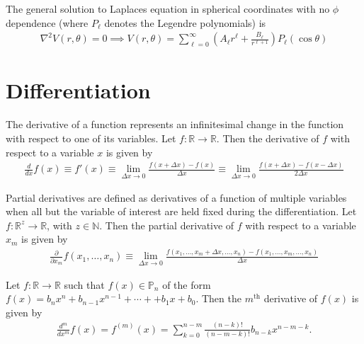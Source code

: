 \begin{theo}{1}
	The general solution to Laplaces equation in spherical coordinates with no $\phi$ dependence (where $P_\ell$ denotes the Legendre polynomials) is
	\begin{align}
		\nabla^2 V(r,\theta) = 0 \implies V(r,\theta) = \sum_{\ell=0}^{\infty}\left(A_\ell r^\ell+\frac{B_\ell}{r^{\ell+1}}\right)P_\ell(\cos\theta)
	\end{align}
\end{theo}



\section{Differentiation}
\begin{defn}{1}
	The derivative of a function represents an infinitesimal change in the function with respect to one of its variables. Let $f:\mathbb{R}\rightarrow\mathbb{R}$. Then the derivative of $f$ with respect to a variable $x$ is given by
	\begin{align}
	\frac{d}{dx}f(x)\equiv f'(x) \equiv\lim\limits_{\Delta x \rightarrow 0}\frac{f(x+\Delta x)-f(x)}{\Delta x} \equiv \lim\limits_{\Delta x \rightarrow 0}\frac{f(x+\Delta x)-f(x-\Delta x)}{2\Delta x}
	\end{align}
\end{defn} 
\begin{defn}{1}
	Partial derivatives are defined as derivatives of a function of multiple variables when all but the variable of interest are held fixed during the differentiation. Let $f:\mathbb{R}^z\rightarrow\mathbb{R}$, with $z \in \mathbb{N}$. Then the partial derivative of $f$ with respect to a variable $x_m$ is given by
	\begin{align}
	\frac{\partial}{\partial x_m}f(x_1,\dots,x_n) \equiv \lim\limits_{\Delta x \rightarrow 0}\frac{f(x_1,\dots,x_m+\Delta x, \dots,x_n)-f(x_1,\dots,x_m,\dots,x_n)}{\Delta x}
	\end{align}
\end{defn}
\begin{fancybox}{}
	Let $f:\mathbb{R}\rightarrow\mathbb{R}$ such that $f(x)\in\mathbb{P}_n$ of the form $f(x)=b_nx^n+b_{n-1}x^{n-1}+\cdots++b_1x+b_0$. Then the $m^{\textrm{th}}$ derivative of $f(x)$ is given by
	\begin{align}
	\frac{d^m}{dx^m}f(x)=f^{(m)}(x)=\sum_{k=0}^{n-m}\frac{(n-k)!}{(n-m-k)!}b_{n-k}x^{n-m-k}.
	\end{align}
\end{fancybox}
